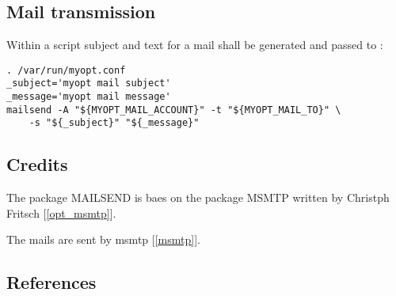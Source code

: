 \subsection{Mail transmission}
    Within a script subject and text for a mail shall be generated
    and passed to :
    
\begin{verbatim}
. /var/run/myopt.conf
_subject='myopt mail subject'
_message='myopt mail message'
mailsend -A "${MYOPT_MAIL_ACCOUNT}" -t "${MYOPT_MAIL_TO}" \
    -s "${_subject}" "${_message}"
\end{verbatim}

 
\subsection{Credits}

  The package MAILSEND is baes on the package MSMTP 
  written by Christph Fritsch {[\ref{opt_msmtp}]}.

  The mails are sent by msmtp {[\ref{msmtp}]}.
  
\subsection{References}

\begin{list}{\textbf{[]}}{}
  
  \item \label{opt_msmtp}
  
  \item \label{msmtp}

    \item \label{rfc5322}
\end{list}

